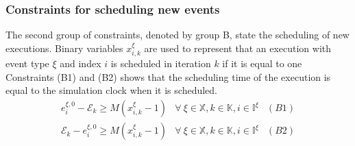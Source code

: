 \documentclass[]{interact}
\theoremstyle{plain}%
\theoremstyle{definition}
\theoremstyle{remark}
\begin{document}
\subsubsection{Constraints for scheduling new events}\label{sec:const_B}
The second group of constraints, denoted by group B, state the scheduling of new executions. Binary variables $x^{\xi}_{i,k}$ are used to represent that an execution with event type $\xi$ and index $i$ is scheduled in iteration $k$ if it is equal to one%
Constraints (B1) and (B2) shows that the scheduling time of the execution is equal to the simulation clock when it is scheduled.
\begin{eqnarray}
e^{\xi,0}_i-\mathcal{E}_{k} \ge M(x^{\xi}_{i,k}-1)& \forall\ \xi\in \mathbb{X},k\in \mathbb{K},i\in \mathbb{I}^{\xi}&(B1)\nonumber\\
\mathcal{E}_{k} -e^{\xi,0}_i\ge M(x^{\xi}_{i,k}-1)&\forall\ \xi\in \mathbb{X},k\in \mathbb{K},i\in \mathbb{I}^{\xi}&(B2)\nonumber
\end{eqnarray}
\end{document}
